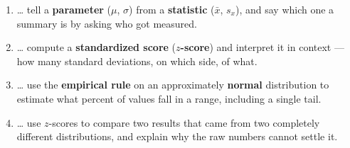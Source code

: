 \documentclass[12pt]{article}
\begin{document}

\namedateperiod
\vspace{0.18in}

\boxguard[14]
\begin{learningtargetbox}
\small
\begin{enumerate}[leftmargin=1.5em, itemsep=5pt]
  \item \ldots{} tell a \textbf{parameter} ($\mu$, $\sigma$) from a \textbf{statistic}
        ($\bar x$, $s_x$), and say which one a summary is by asking who got measured.
  \item \ldots{} compute a \textbf{standardized score} (\textbf{$z$-score}) and interpret it in
        context --- how many standard deviations, on which side, of what.
  \item \ldots{} use the \textbf{empirical rule} on an approximately \textbf{normal}
        distribution to estimate what percent of values fall in a range, including a single tail.
  \item \ldots{} use $z$-scores to compare two results that came from two completely different
        distributions, and explain why the raw numbers cannot settle it.
\end{enumerate}
\end{learningtargetbox}

\vspace{0.14in}
\end{document}
